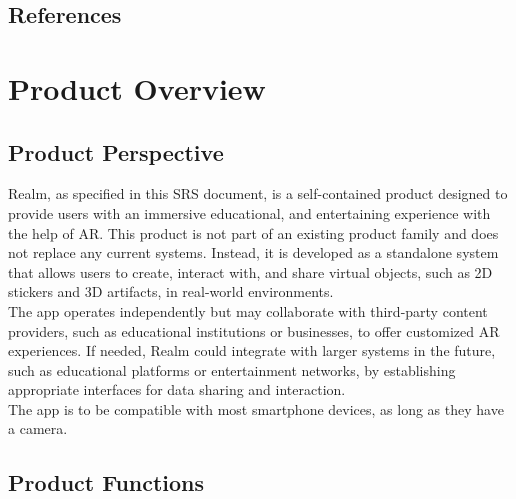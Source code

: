 \documentclass{article}
\begin{document}
\subsection{References}
\label{sub:references}

\begingroup
\raggedright

\endgroup



\section{Product Overview}

\subsection{Product Perspective}

Realm, as specified in this SRS document, is a self-contained product designed to provide users with an immersive educational, and entertaining experience with the help of AR. This product is not part of an existing product family and does not replace any current systems. Instead, it is developed as a standalone system that allows users to create, interact with, and share virtual objects, such as 2D stickers and 3D artifacts, in real-world environments.\\

The app operates independently but may collaborate with third-party content providers, such as educational institutions or businesses, to offer customized AR experiences. If needed, Realm could integrate with larger systems in the future, such as educational platforms or entertainment networks, by establishing appropriate interfaces for data sharing and interaction.\\

The app is to be compatible with most smartphone devices, as long as they have a camera.


\subsection{Product Functions}
\end{document}
